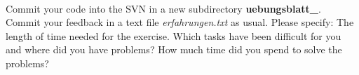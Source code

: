 \\
Commit your code into the SVN in a new subdirectory 
\textbf{uebungsblatt\_\ExerciseSheetNumber}. Commit your feedback in a text file 
\emph{erfahrungen.txt} as usual. Please specify: The length of time needed for 
the exercise. Which tasks have been difficult for you and where did you have 
problems? How much time did you spend to solve the problems?
